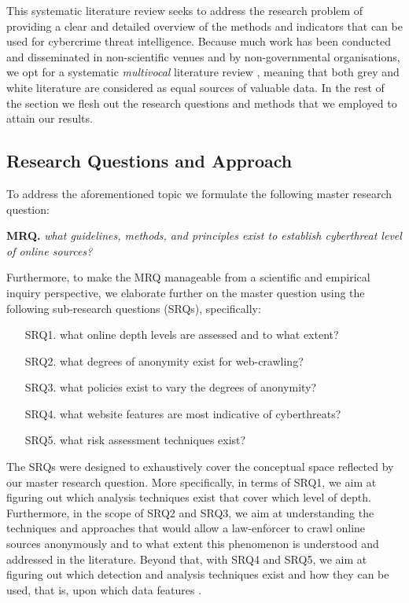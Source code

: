 This systematic literature review seeks to address the research problem of providing a clear and detailed overview of the methods and indicators that can be used for cybercrime threat intelligence. Because much work has been conducted and disseminated in non-scientific venues and by non-governmental organisations, we opt for a systematic \emph{multivocal} literature review \cite{mv}, meaning that both grey and white literature are considered as equal sources of valuable data. In the rest of the section we flesh out the research questions and methods that we employed to attain our results.

\subsection{Research Questions and Approach}

To address the aforementioned topic we formulate the following master research question:
\begin{center}
    \textbf{MRQ.} \emph{what guidelines, methods, and principles exist to establish cyberthreat level of online sources?}
\end{center}

Furthermore, to make the MRQ manageable from a scientific and empirical inquiry perspective, we elaborate further on the master question using the following sub-research questions (SRQs), specifically:
\begin{enumerate}
\item [SRQ1.] what online depth levels are assessed and to what extent?
\item [SRQ2.] what degrees of anonymity exist for web-crawling?
\item [SRQ3.] what policies exist to vary the degrees of anonymity?
\item [SRQ4.] what website features are most indicative of cyberthreats?
\item [SRQ5.] what risk assessment techniques exist?
\end{enumerate}

The SRQs were designed to exhaustively cover the conceptual space reflected by our master research question. More specifically, in terms of SRQ1, we aim at figuring out which analysis techniques exist that cover which level of depth. Furthermore, in the scope of SRQ2 and SRQ3, we aim at understanding the techniques and approaches that would allow a law-enforcer to crawl online sources anonymously and to what extent this phenomenon is understood and addressed in the literature. Beyond that, with SRQ4 and SRQ5, we aim at figuring out which detection and analysis techniques exist and how they can be used, that is, upon which data features \cite{Zave03}. 

